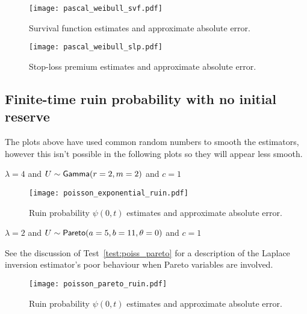 \begin{figure}[H]
\centering
\texttt{[image: pascal\_weibull\_svf.pdf]}
\caption{Survival function estimates and approximate absolute error.}
\end{figure}

\begin{figure}[H]
\centering
\texttt{[image: pascal\_weibull\_slp.pdf]}
\caption{Stop-loss premium estimates and approximate absolute error.}
\end{figure}


\subsection{Finite-time ruin probability with no initial reserve} \label{subsec:ApproximationFiniteTimeRuinProbability}



The plots above have used common random numbers to smooth the estimators, however this isn't possible in the following plots so they will appear less smooth.

\begin{test}
$\lambda=4$ and $U\sim\mathsf{Gamma}(r=2,m=2)$ and $c=1$
\end{test}


\begin{figure}[H]
\centering
\texttt{[image: poisson\_exponential\_ruin.pdf]}
\caption{Ruin probability $\psi(0, t)$ estimates and approximate absolute error.}
\end{figure}


\begin{test} $\lambda=2$ and $U \sim \mathsf{Pareto}(a=5,b=11,\theta=0)$ and $c=1$
\end{test}

See the discussion of Test~\ref{test:poiss_pareto} for a description of the Laplace inversion estimator's poor behaviour when Pareto variables are involved.

\begin{figure}[H]
\centering
\texttt{[image: poisson\_pareto\_ruin.pdf]}
\caption{Ruin probability $\psi(0, t)$ estimates and approximate absolute error.}
\end{figure}
